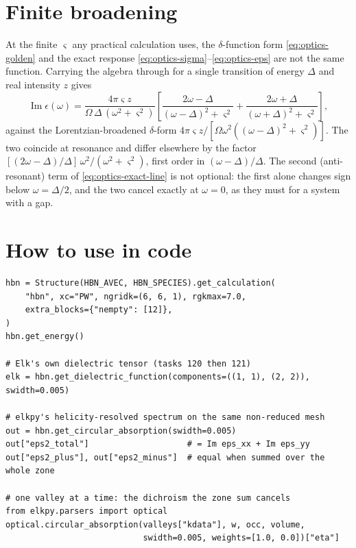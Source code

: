 \documentclass[11pt]{article}
\begin{document}
\section{Finite broadening}

At the finite $\varsigma$ any practical calculation uses, the
$\delta$-function form \eqref{eq:optics-golden} and the exact response
\eqref{eq:optics-sigma}--\eqref{eq:optics-eps} are not the same function.
Carrying the algebra through for a single transition of energy $\Delta$ and
real intensity $z$ gives
%
\begin{equation}
  \operatorname{Im}\epsilon(\omega)=
  \frac{4\pi\varsigma z}{\Omega\,\Delta\,(\omega^2+\varsigma^2)}
  \left[\frac{2\omega-\Delta}{(\omega-\Delta)^2+\varsigma^2}
       +\frac{2\omega+\Delta}{(\omega+\Delta)^2+\varsigma^2}\right],
  \label{eq:optics-exact-line}
\end{equation}
%
against the Lorentzian-broadened $\delta$-form
$4\pi\varsigma z/[\Omega\omega^2((\omega-\Delta)^2+\varsigma^2)]$. The two
coincide at resonance and differ elsewhere by the factor
$[(2\omega-\Delta)/\Delta]\,\omega^2/(\omega^2+\varsigma^2)$, first order in
$(\omega-\Delta)/\Delta$. The second (anti-resonant) term of
\eqref{eq:optics-exact-line} is not optional: the first alone changes sign
below $\omega=\Delta/2$, and the two cancel exactly at $\omega=0$, as they
must for a system with a gap.

\section{How to use in code}

\begin{verbatim}
hbn = Structure(HBN_AVEC, HBN_SPECIES).get_calculation(
    "hbn", xc="PW", ngridk=(6, 6, 1), rgkmax=7.0,
    extra_blocks={"nempty": [12]},
)
hbn.get_energy()

# Elk's own dielectric tensor (tasks 120 then 121)
elk = hbn.get_dielectric_function(components=((1, 1), (2, 2)), swidth=0.005)

# elkpy's helicity-resolved spectrum on the same non-reduced mesh
out = hbn.get_circular_absorption(swidth=0.005)
out["eps2_total"]                    # = Im eps_xx + Im eps_yy
out["eps2_plus"], out["eps2_minus"]  # equal when summed over the whole zone

# one valley at a time: the dichroism the zone sum cancels
from elkpy.parsers import optical
optical.circular_absorption(valleys["kdata"], w, occ, volume,
                            swidth=0.005, weights=[1.0, 0.0])["eta"]
\end{verbatim}
\end{document}

